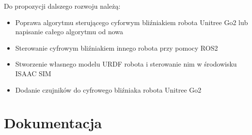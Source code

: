 \documentclass[12pt]{article}
\begin{document}
Do propozycji dalszego rozwoju należą:
\begin{itemize}
    \item Poprawa algorytmu sterującego cyforwym bliźniakiem robota Unitree Go2 lub napisanie całego algorytmu od nowa
    \item Sterowanie cyfrowym bliźniakiem innego robota przy pomocy ROS2
    \item Stworzenie własnego modelu URDF robota i sterowanie nim w środowisku ISAAC SIM
    \item Dodanie czujników do cyfrowego bliźniaka robota Unitree Go2
\end{itemize}

\section{Dokumentacja}
\end{document}
